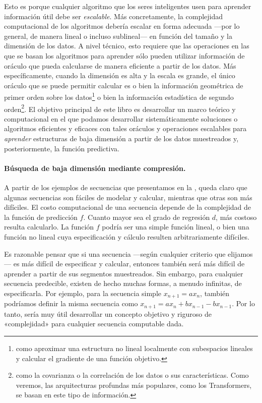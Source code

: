 \documentclass[../../book-main_es.tex]{subfiles}
\begin{document}
Esto es porque cualquier algoritmo que los seres inteligentes usen para aprender
información útil debe ser \textit{escalable}. Más concretamente, la
complejidad computacional de los algoritmos debería escalar en forma adecuada ---por 
lo general, de manera lineal o incluso sublineal--- en función del tamaño y
la dimensión de los datos. A nivel técnico, esto requiere que las operaciones
en las que se basan los algoritmos para aprender sólo pueden utilizar información
de oráculo que pueda calcularse de manera eficiente a partir de los datos. Más
específicamente, cuando la dimensión es alta y la escala es grande, el único oráculo 
que se puede permitir calcular es o bien la información geométrica de primer orden
sobre los datos\footnote{como aproximar una estructura no lineal localmente con 
    subespacios lineales y calcular el gradiente de una 
función objetivo.} o bien la información estadística de segundo orden\footnote{como 
    la covarianza o la correlación de los datos o sus características. Como veremos, 
    las arquitecturas profundas más populares, como
los Transformers, se basan en este tipo de información.}.
El objetivo principal de este libro es desarrollar un marco teórico y
computacional en el que podamos desarrollar sistemáticamente
soluciones o algoritmos eficientes y eficaces con tales oráculos y operaciones
escalables para \textit{aprender} estructuras de baja dimensión
a partir de los datos muestreados y, posteriormente, la función predictiva.

\paragraph{Búsqueda de baja dimensión mediante compresión.}
A partir de los ejemplos de secuencias que presentamos en la ,
queda claro que algunas secuencias son fáciles de modelar y calcular, mientras que
otras son más difíciles. El costo computacional de una secuencia
depende de la complejidad de la función de predicción \(f\). Cuanto
mayor sea el grado de regresión \(d\), más costoso resulta
calcularlo. La función \(f\) podría ser una simple función lineal, o bien
una función no lineal cuya especificación y cálculo
resulten arbitrariamente difíciles.

Es razonable pensar que si una secuencia ---según cualquier criterio que 
elijamos--- es más difícil de especificar y calcular, entonces también 
será más difícil de aprender a partir de sus segmentos muestreados.
Sin embargo, para cualquier secuencia predecible, existen de hecho
muchas formas, a menudo infinitas, de especificarla. Por ejemplo, para la
secuencia simple \(x_{n+1} = a x_{n}\), también podríamos definir la misma
secuencia como \(x_{n+1} = a x_{n} + b x_{n-1} - b x_{n-1}\).
Por lo tanto, sería muy útil desarrollar un concepto objetivo y riguroso
de «complejidad» para cualquier secuencia computable dada.
\end{document}
